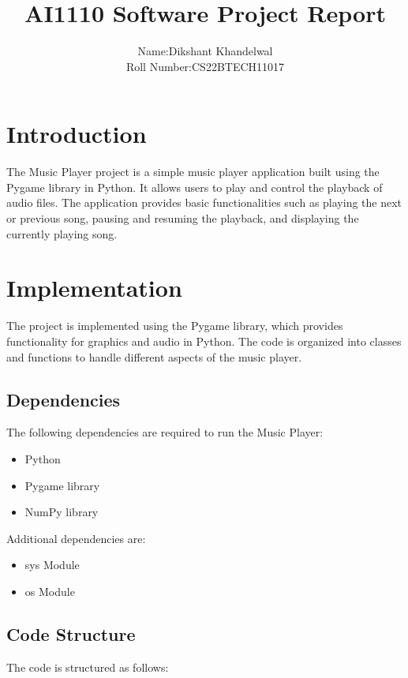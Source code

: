 \documentclass[journal,12pt,twocolumn]{IEEEtran}
\begin{document}
\title{AI1110 Software Project Report}
\author{Name:Dikshant Khandelwal\\
        Roll Number:CS22BTECH11017}

\maketitle

\section{Introduction}
The Music Player project is a simple music player application built using the Pygame library in Python. It allows users to play and control the playback of audio files. The application provides basic functionalities such as playing the next or previous song, pausing and resuming the playback, and displaying the currently playing song.

\section{Implementation}
The project is implemented using the Pygame library, which provides functionality for graphics and audio in Python. The code is organized into classes and functions to handle different aspects of the music player.

\subsection{Dependencies}
The following dependencies are required to run the Music Player:
\begin{itemize}
\item Python 
\item Pygame library
\item NumPy library
\end{itemize}
Additional dependencies are:
\begin{itemize}
        \item sys Module
        \item os Module
\end{itemize}

\subsection{Code Structure}
The code is structured as follows:
\end{document}
